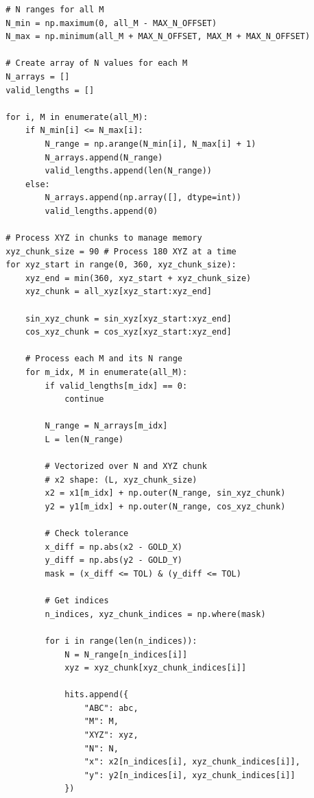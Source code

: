 \documentclass{article}
\begin{document}
\begin{enumerate}
\begin{verbatim}
        # N ranges for all M
        N_min = np.maximum(0, all_M - MAX_N_OFFSET)
        N_max = np.minimum(all_M + MAX_N_OFFSET, MAX_M + MAX_N_OFFSET)
        
        # Create array of N values for each M
        N_arrays = []
        valid_lengths = []
        
        for i, M in enumerate(all_M):
            if N_min[i] <= N_max[i]:
                N_range = np.arange(N_min[i], N_max[i] + 1)
                N_arrays.append(N_range)
                valid_lengths.append(len(N_range))
            else:
                N_arrays.append(np.array([], dtype=int))
                valid_lengths.append(0)
        
        # Process XYZ in chunks to manage memory
        xyz_chunk_size = 90 # Process 180 XYZ at a time
        for xyz_start in range(0, 360, xyz_chunk_size):
            xyz_end = min(360, xyz_start + xyz_chunk_size)
            xyz_chunk = all_xyz[xyz_start:xyz_end]
            
            sin_xyz_chunk = sin_xyz[xyz_start:xyz_end]
            cos_xyz_chunk = cos_xyz[xyz_start:xyz_end]
            
            # Process each M and its N range
            for m_idx, M in enumerate(all_M):
                if valid_lengths[m_idx] == 0:
                    continue
                    
                N_range = N_arrays[m_idx]
                L = len(N_range)
                
                # Vectorized over N and XYZ chunk
                # x2 shape: (L, xyz_chunk_size)
                x2 = x1[m_idx] + np.outer(N_range, sin_xyz_chunk)
                y2 = y1[m_idx] + np.outer(N_range, cos_xyz_chunk)
                
                # Check tolerance
                x_diff = np.abs(x2 - GOLD_X)
                y_diff = np.abs(y2 - GOLD_Y)
                mask = (x_diff <= TOL) & (y_diff <= TOL)
                
                # Get indices
                n_indices, xyz_chunk_indices = np.where(mask)
                
                for i in range(len(n_indices)):
                    N = N_range[n_indices[i]]
                    xyz = xyz_chunk[xyz_chunk_indices[i]]
                    
                    hits.append({
                        "ABC": abc,
                        "M": M,
                        "XYZ": xyz,
                        "N": N,
                        "x": x2[n_indices[i], xyz_chunk_indices[i]],
                        "y": y2[n_indices[i], xyz_chunk_indices[i]]
                    })
    

\end{verbatim}
\end{enumerate}
\end{document}
